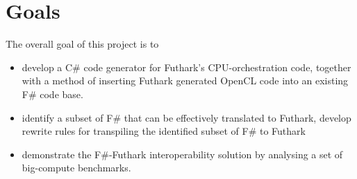 \documentclass{article}
\newcommand{\fshark}{\texttt{F\#thark}}
\begin{document}
\section{Goals}
The overall goal of this project is to
\begin{itemize}
    \item develop a C\# code generator for Futhark's CPU-orchestration code,
            together with a method of inserting Futhark generated OpenCL code into
            an existing F\# code base.

    \item identify a subset of F\# that can be effectively translated to Futhark,
            develop rewrite rules for transpiling the identified subset of F\# to 
            Futhark


    \item demonstrate the F\#-Futhark interoperability solution by analysing 
            a set of big-compute benchmarks.
\end{itemize}
\end{document}
